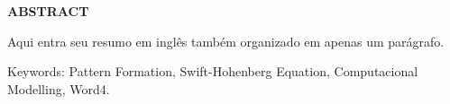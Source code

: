 \begin{center}
\textbf{ABSTRACT}
\end{center}

$\!$\\


Aqui entra seu resumo em inglês também organizado em apenas um parágrafo.

\vspace{1cm}

\hspace{-1.3cm}Keywords: Pattern Formation, Swift-Hohenberg Equation, Computacional Modelling, Word4.